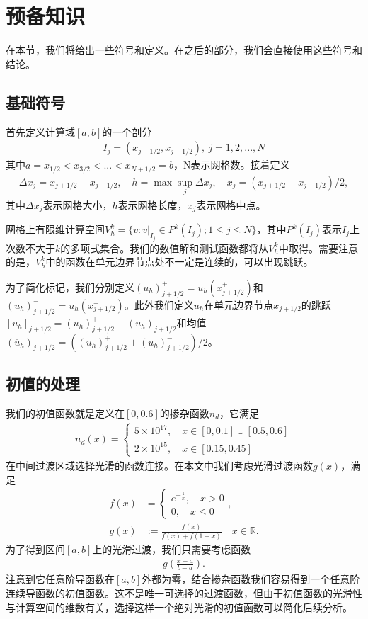 \cleardoublepage

\section{预备知识}
在本节，我们将给出一些符号和定义。在之后的部分，我们会直接使用这些符号和结论。
\subsection{基础符号}
首先定义计算域$[a,b]$的一个剖分
\begin{align*}
    I_{j} = (x_{j-1/2}, x_{j+1/2}), \ j = 1, 2, ..., N
\end{align*}
其中$a=x_{1/2} < x_{3/2}< ...< x_{N+1/2}=b$，N表示网格数。接着定义
\begin{align*}
    \Delta x_j = x_{j+1/2}-x_{j-1/2}, \quad h = \max{\sup_j{\Delta x_j}}, \quad x_j = (x_{j+1/2}+x_{j-1/2})/{2},
\end{align*}
其中$\Delta x_j$表示网格大小，$h$表示网格长度，$x_j$表示网格中点。

网格上有限维计算空间$V_h^k = \{v:v|_{I_j}\in P^k(I_j); 1\leq j\leq N\}$，其中$P^k(I_j)$表示$I_j$上次数不大于$k$的多项式集合。我们的数值解和测试函数都将从$V_h^k$中取得。需要注意的是，$V_h^k$中的函数在单元边界节点处不一定是连续的，可以出现跳跃。

为了简化标记，我们分别定义$(u_h)^+_{j+1/2}=u_h(x^+_{j+1/2})$和$(u_h)^-_{j+1/2}=u_h(x^-_{j+1/2})$。此外我们定义$u_h$在单元边界节点$x_{j+1/2}$的跳跃$[u_h]_{j+1/2}=(u_h)^+_{j+1/2}-(u_h)^-_{j+1/2}$和均值$(\overline{u}_h)_{j+1/2}=((u_h)_{j+1/2}^++(u_h)_{j+1/2}^-)/2$。
\subsection{初值的处理}
我们的初值函数就是定义在$[0, 0.6]$的掺杂函数$n_d$，它满足
\begin{align*}
    n_d(x) = \begin{cases}
                 5\times 10^{17}, \quad x \in [0, 0.1] \cup [0.5, 0.6] \\
                 2\times 10^{15}, \quad x \in [0.15,0.45]
             \end{cases}
\end{align*}
在中间过渡区域选择光滑的函数连接。在本文中我们考虑光滑过渡函数$g(x)$，满足
\begin{align*}
    f(x)               & ={\begin{cases}
                               e^{-{\frac {1}{x}}}, \quad x>0 \\
                               0, \quad x\leq 0\end{cases}} ,                     \\
    \displaystyle g(x) & :={\frac {f(x)}{f(x)+f(1-x)}}\quad x\in \mathbb {R}.
\end{align*}
为了得到区间$[a,b]$上的光滑过渡，我们只需要考虑函数
\begin{align*}
    g(\frac{x-a}{b-a}).
\end{align*}
注意到它任意阶导函数在$[a,b]$外都为零，结合掺杂函数我们容易得到一个任意阶连续导函数的初值函数。这不是唯一可选择的过渡函数，但由于初值函数的光滑性与计算空间的维数有关，选择这样一个绝对光滑的初值函数可以简化后续分析。

